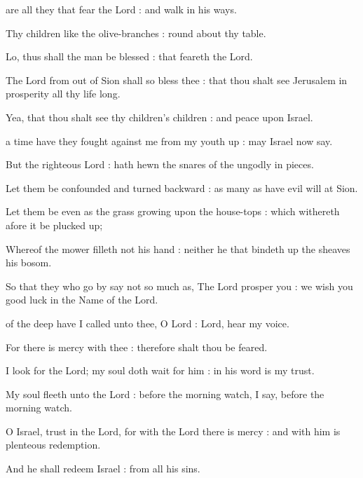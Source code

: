 
 are all they that fear the Lord : and walk in his ways.\par
{}
Thy children like the olive-branches : round about thy table.\par
{}Lo, thus shall the man be blessed : that feareth the Lord.\par
{}The Lord from out of Sion shall so bless thee : that thou shalt see Jerusalem in prosperity all thy life long.\par
{}Yea, that thou shalt see thy children's children : and peace upon Israel.\par


 a time have they fought against me from my youth up : may Israel now say.\par
{}
But the righteous Lord : hath hewn the snares of the ungodly in pieces.\par
{}Let them be confounded and turned backward : as many as have evil will at Sion.\par
{}Let them be even as the grass growing upon the house-tops : which withereth afore it be plucked up;\par
{}Whereof the mower filleth not his hand : neither he that bindeth up the sheaves his bosom.\par
{}So that they who go by say not so much as, The Lord prosper you : we wish you good luck in the Name of the Lord.\par


 of the deep have I called unto thee, O Lord : Lord, hear my voice.\par
{}
For there is mercy with thee : therefore shalt thou be feared.\par
{}I look for the Lord; my soul doth wait for him : in his word is my trust.\par
{}My soul fleeth unto the Lord : before the morning watch, I say, before the morning watch.\par
{}O Israel, trust in the Lord, for with the Lord there is mercy : and with him is plenteous redemption.\par
{}And he shall redeem Israel : from all his sins.\par

